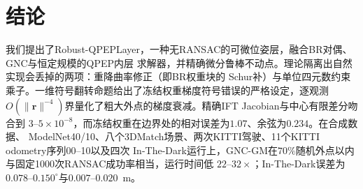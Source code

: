 \section{结论}
\label{sec:conclusion}

我们提出了Robust-QPEPLayer，一种无RANSAC的可微位姿层，融合BR对偶、GNC与恒定规模的QPEP内层
求解器，并精确微分鲁棒不动点。理论隔离出自然实现会丢掉的两项：重降曲率修正（即BR权重块的
Schur补）与单位四元数约束乘子。一维符号翻转命题给出了冻结权重梯度符号错误的严格设定，逐观测
$O(\|\mathbf{r}\|^{-4})$界量化了粗大外点的梯度衰减。精确IFT Jacobian与中心有限差分吻合到
$3$--$5\times10^{-8}$，而冻结权重在边界处的相对误差为$1.07$、余弦为$0.234$。在合成数据、
ModelNet40/10、八个3DMatch场景、两次KITTI驾驶、11个KITTI odometry序列00--10以及四次
In-The-Dark运行上，GNC-GM在$70\%$随机外点以内与固定1000次RANSAC成功率相当，运行时间低
$22$--$32\times$；In-The-Dark误差为$0.078$--$0.150^\circ$与$0.007$--$0.020$~m。
